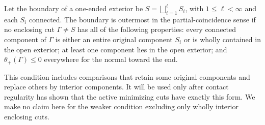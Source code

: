\begin{definition}
\label{n3:rigidity:partial-outermostness}
Let the boundary of a one-ended exterior be
$S=\bigsqcup_{i=1}^{\ell}S_i$, with $1\leq\ell<\infty$ and each
$S_i$ connected. The boundary is outermost in the partial-coincidence
sense if no enclosing cut $\Gamma\ne S$ has all of the following
properties: every connected component of $\Gamma$ is either an entire
original component $S_i$ or is wholly contained in the open exterior;
at least one component lies in the open exterior; and
$\theta_+(\Gamma)\leq0$ everywhere for the normal toward the end.
\end{definition}

This condition includes comparisons that retain some original
components and replace others by interior components. It will be used
only after contact regularity has shown that the active minimizing
cuts have exactly this form. We make no claim here for the weaker
condition excluding only wholly interior enclosing cuts.

